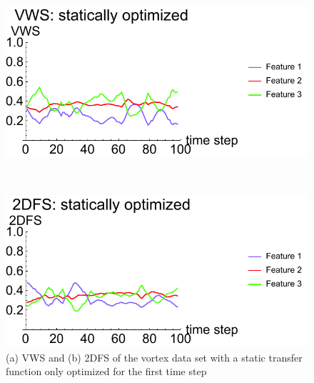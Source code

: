 \begin{figure}
	\centering
	\begin{minipage}{.5\textwidth}
		\includegraphics[width=1\linewidth]{figures/vorts_static_VWS}
		\subcaption{}
	\end{minipage}~
	\begin{minipage}{.5\textwidth}
		\includegraphics[width=1\linewidth]{figures/vorts_static_2DFS}
		\subcaption{}
	\end{minipage}
	\caption{(a) VWS and (b) 2DFS of the vortex data set with a static transfer function only optimized for the first time step}
	\label{fig:vorts_static}
\end{figure}

